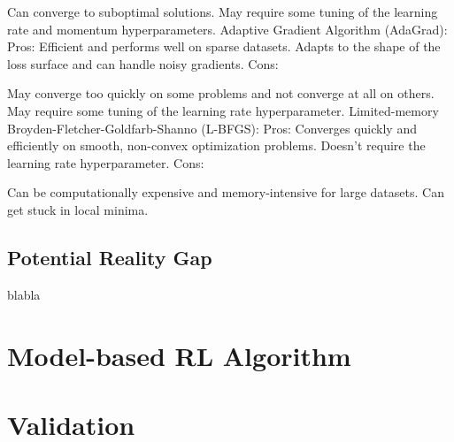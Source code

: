 Can converge to suboptimal solutions.
May require some tuning of the learning rate and momentum hyperparameters.
Adaptive Gradient Algorithm (AdaGrad):
Pros:
Efficient and performs well on sparse datasets.
Adapts to the shape of the loss surface and can handle noisy gradients.
Cons:

May converge too quickly on some problems and not converge at all on others.
May require some tuning of the learning rate hyperparameter.
Limited-memory Broyden-Fletcher-Goldfarb-Shanno (L-BFGS):
Pros:
Converges quickly and efficiently on smooth, non-convex optimization problems.
Doesn't require the learning rate hyperparameter.
Cons:

Can be computationally expensive and memory-intensive for large datasets.
Can get stuck in local minima.
\subsection{Potential Reality Gap}
blabla

\section{Model-based RL Algorithm}

\section{Validation}